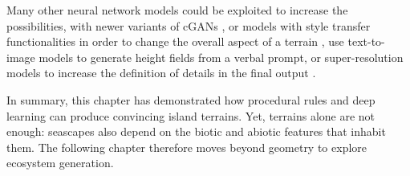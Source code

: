 Many other neural network models could be exploited to increase the possibilities, with newer variants of cGANs \cite{Park2019}, or models with style transfer functionalities \cite{Gatys2015,Zhu2020} in order to change the overall aspect of a terrain \cite{Perche2023a,Perche2023b}, use text-to-image models \cite{Rombach2021,Radford2021} to generate height fields from a verbal prompt, or super-resolution models \cite{Dong2014} to increase the definition of details in the final output \cite{Guerin2016a}.

In summary, this chapter has demonstrated how procedural rules and deep learning can produce convincing island terrains. Yet, terrains alone are not enough: seascapes also depend on the biotic and abiotic features that inhabit them. The following chapter therefore moves beyond geometry to explore ecosystem generation.
